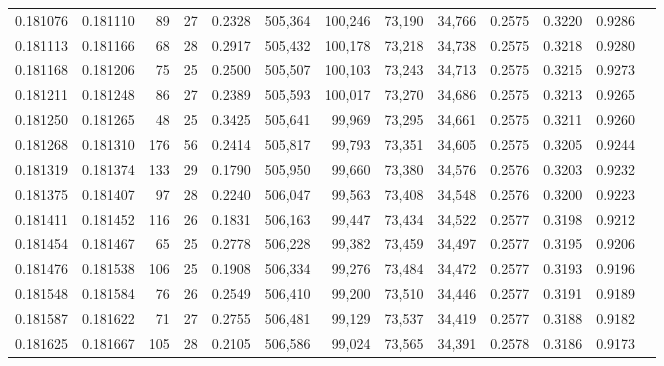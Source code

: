 \begin{tabular}{rrrrrrrrrrrrr}
0.181076 & 0.181110 &    89 &  27 &                                     0.2328 & 505,364 & 100,246 &  73,190 &  34,766 & 0.2575 & 0.3220 & 0.9286 \\
0.181113 & 0.181166 &    68 &  28 &                                     0.2917 & 505,432 & 100,178 &  73,218 &  34,738 & 0.2575 & 0.3218 & 0.9280 \\
0.181168 & 0.181206 &    75 &  25 &                                     0.2500 & 505,507 & 100,103 &  73,243 &  34,713 & 0.2575 & 0.3215 & 0.9273 \\
0.181211 & 0.181248 &    86 &  27 &                                     0.2389 & 505,593 & 100,017 &  73,270 &  34,686 & 0.2575 & 0.3213 & 0.9265 \\
0.181250 & 0.181265 &    48 &  25 &                                     0.3425 & 505,641 &  99,969 &  73,295 &  34,661 & 0.2575 & 0.3211 & 0.9260 \\
0.181268 & 0.181310 &   176 &  56 &                                     0.2414 & 505,817 &  99,793 &  73,351 &  34,605 & 0.2575 & 0.3205 & 0.9244 \\
0.181319 & 0.181374 &   133 &  29 &                                     0.1790 & 505,950 &  99,660 &  73,380 &  34,576 & 0.2576 & 0.3203 & 0.9232 \\
0.181375 & 0.181407 &    97 &  28 &                                     0.2240 & 506,047 &  99,563 &  73,408 &  34,548 & 0.2576 & 0.3200 & 0.9223 \\
0.181411 & 0.181452 &   116 &  26 &                                     0.1831 & 506,163 &  99,447 &  73,434 &  34,522 & 0.2577 & 0.3198 & 0.9212 \\
0.181454 & 0.181467 &    65 &  25 &                                     0.2778 & 506,228 &  99,382 &  73,459 &  34,497 & 0.2577 & 0.3195 & 0.9206 \\
0.181476 & 0.181538 &   106 &  25 &                                     0.1908 & 506,334 &  99,276 &  73,484 &  34,472 & 0.2577 & 0.3193 & 0.9196 \\
0.181548 & 0.181584 &    76 &  26 &                                     0.2549 & 506,410 &  99,200 &  73,510 &  34,446 & 0.2577 & 0.3191 & 0.9189 \\
0.181587 & 0.181622 &    71 &  27 &                                     0.2755 & 506,481 &  99,129 &  73,537 &  34,419 & 0.2577 & 0.3188 & 0.9182 \\
0.181625 & 0.181667 &   105 &  28 &                                     0.2105 & 506,586 &  99,024 &  73,565 &  34,391 & 0.2578 & 0.3186 & 0.9173 \\

\end{tabular}
